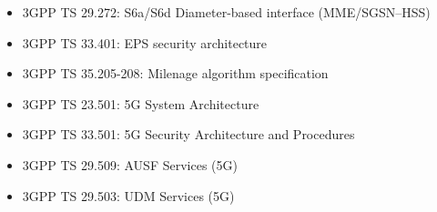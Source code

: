 
\begin{itemize}
\tightlist
\item
  3GPP TS 29.272: S6a/\allowbreak{}S6d Diameter-based interface (MME/\allowbreak{}SGSN–HSS)
\item
  3GPP TS 33.401: EPS security architecture
\item
  3GPP TS 35.205-208: Milenage algorithm specification
\item
  3GPP TS 23.501: 5G System Architecture
\item
  3GPP TS 33.501: 5G Security Architecture and Procedures
\item
  3GPP TS 29.509: AUSF Services (5G)
\item
  3GPP TS 29.503: UDM Services (5G)
\end{itemize}
